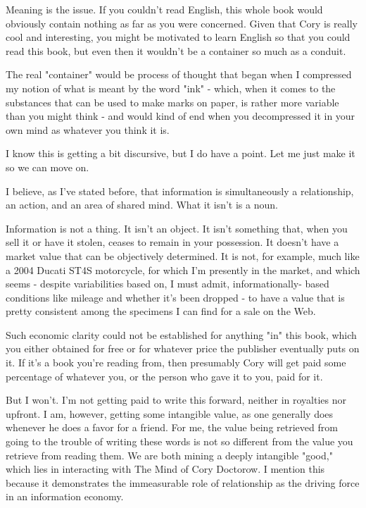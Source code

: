 Meaning is the issue. If you couldn't read English, this whole book
would obviously contain nothing as far as you were concerned. Given
that Cory is really cool and interesting, you might be motivated to
learn English so that you could read this book, but even then it
wouldn't be a container so much as a conduit.

The real "container" would be process of thought that began when I
compressed my notion of what is meant by the word "ink" - which,
when it comes to the substances that can be used to make marks on
paper, is rather more variable than you might think - and would
kind of end when you decompressed it in your own mind as whatever
you think it is.

I know this is getting a bit discursive, but I do have a point. Let
me just make it so we can move on.

I believe, as I've stated before, that information is
simultaneously a relationship, an action, and an area of shared
mind. What it isn't is a noun.

Information is not a thing. It isn't an object. It isn't something
that, when you sell it or have it stolen, ceases to remain in your
possession. It doesn't have a market value that can be objectively
determined. It is not, for example, much like a 2004 Ducati ST4S
motorcycle, for which I'm presently in the market, and which seems
- despite variabilities based on, I must admit, informationally-
based conditions like mileage and whether it's been dropped - to
have a value that is pretty consistent among the specimens I can
find for a sale on the Web.

Such economic clarity could not be established for anything "in"
this book, which you either obtained for free or for whatever price
the publisher eventually puts on it. If it's a book you're reading
from, then presumably Cory will get paid some percentage of
whatever you, or the person who gave it to you, paid for it.

But I won't. I'm not getting paid to write this forward, neither in
royalties nor upfront. I am, however, getting some intangible
value, as one generally does whenever he does a favor for a friend.
For me, the value being retrieved from going to the trouble of
writing these words is not so different from the value you retrieve
from reading them. We are both mining a deeply intangible "good,"
which lies in interacting with The Mind of Cory Doctorow. I mention
this because it demonstrates the immeasurable role of relationship
as the driving force in an information economy.

